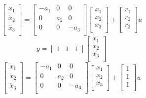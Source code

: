 \begin{equation*}
  \begin{bmatrix}
    \dot{x}_1 \\ %
    \dot{x}_2 \\
    \dot{x}_3 \\
  \end{bmatrix}=
  \begin{bmatrix}
    -a_1 & 0 & 0 \\ %
    0 & a_2 & 0 \\
    0 & 0 & -a_3 \\
  \end{bmatrix}
  \begin{bmatrix}
    x_1 \\ %
    x_2 \\
    x_3 \\
  \end{bmatrix}+
  \begin{bmatrix}
    r_1 \\ %
    r_2 \\
    r_3 \\
  \end{bmatrix}u
\end{equation*}
\begin{equation*} y=
  \begin{bmatrix}
    1 & 1 & 1
  \end{bmatrix}
  \begin{bmatrix}
    x_1 \\ %
    x_2 \\
    x_3 \\
  \end{bmatrix}
\end{equation*}
\begin{equation*}
  \begin{bmatrix}
    \dot{x}_1 \\ %
    \dot{x}_2 \\
    \dot{x}_3 \\
  \end{bmatrix}=
  \begin{bmatrix}
    -a_1 & 0 & 0 \\ %
    0 & a_2 & 0 \\
    0 & 0 & -a_3 \\
  \end{bmatrix}
  \begin{bmatrix}
    x_1 \\ %
    x_2 \\
    x_3 \\
  \end{bmatrix}+
  \begin{bmatrix}
    1 \\ %
    1 \\
    1 \\
  \end{bmatrix}u
\end{equation*}

